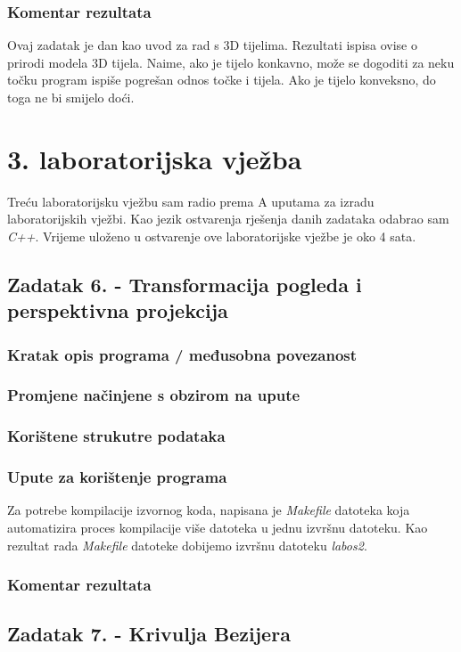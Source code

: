 \documentclass{report}
\begin{document}
\subsection{Komentar rezultata}
Ovaj zadatak je dan kao uvod za rad s 3D tijelima. Rezultati ispisa ovise o prirodi modela 3D tijela. Naime, ako je tijelo konkavno, može se dogoditi za neku točku program ispiše pogrešan odnos točke i tijela. Ako je tijelo konveksno, do toga ne bi smijelo doći.


\chapter{3. laboratorijska vježba}
Treću laboratorijsku vježbu sam radio prema A uputama za izradu laboratorijskih vježbi. Kao jezik ostvarenja rješenja danih zadataka odabrao sam \textit{C++}. Vrijeme uloženo u ostvarenje ove laboratorijske vježbe je oko 4 sata. 

\section{Zadatak 6. - Transformacija pogleda i perspektivna projekcija}
\subsection{Kratak opis programa / međusobna povezanost}
\subsection{Promjene načinjene s obzirom na upute}
\subsection{Korištene strukutre podataka}
\subsection{Upute za korištenje programa}
Za potrebe kompilacije izvornog koda, napisana je \textit{Makefile} datoteka koja automatizira proces kompilacije više datoteka u jednu izvršnu datoteku. Kao rezultat rada \textit{Makefile} datoteke dobijemo izvršnu datoteku \textit{labos2}.

\subsection{Komentar rezultata}

\section{Zadatak 7. - Krivulja Bezijera}
\end{document}

